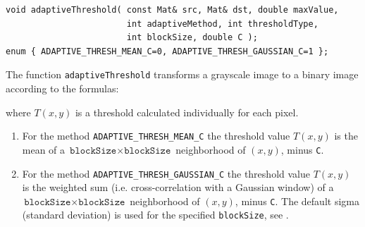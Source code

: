 \begin{lstlisting}
void adaptiveThreshold( const Mat& src, Mat& dst, double maxValue,
                        int adaptiveMethod, int thresholdType,
                        int blockSize, double C );
enum { ADAPTIVE_THRESH_MEAN_C=0, ADAPTIVE_THRESH_GAUSSIAN_C=1 };
\end{lstlisting}
\begin{description}
\end{description}

The function \texttt{adaptiveThreshold} transforms a grayscale image to a binary image according to the formulas:

\begin{description}
\end{description}

where $T(x,y)$ is a threshold calculated individually for each pixel.

\begin{enumerate}
    \item
For the method \texttt{ADAPTIVE\_THRESH\_MEAN\_C} the threshold value $T(x,y)$ is the mean of a $\texttt{blockSize} \times \texttt{blockSize}$ neighborhood of $(x, y)$, minus \texttt{C}.
    \item
For the method \texttt{ADAPTIVE\_THRESH\_GAUSSIAN\_C} the threshold value $T(x, y)$ is the weighted sum (i.e. cross-correlation with a Gaussian window) of a $\texttt{blockSize} \times \texttt{blockSize}$ neighborhood of $(x, y)$, minus \texttt{C}. The default sigma (standard deviation) is used for the specified \texttt{blockSize}, see .
\end{enumerate}

